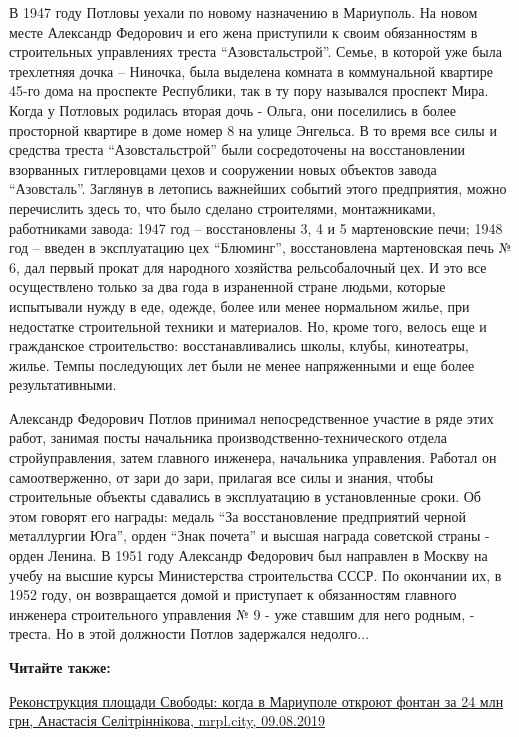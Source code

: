 В 1947 году Потловы уехали по новому назначению в Мариуполь. На новом месте
Александр Федорович и его жена приступили к своим обязанностям в строительных
управлениях треста \enquote{Азовстальстрой}. Семье, в которой уже была
трехлетняя дочка – Ниночка, была выделена комната в коммунальной квартире 45-го
дома на проспекте Республики, так в ту пору назывался проспект Мира. Когда у
Потловых родилась вторая дочь - Ольга, они поселились в более просторной
квартире в доме номер 8 на улице Энгельса. В то время все силы и средства
треста \enquote{Азовстальстрой} были сосредоточены на восстановлении взорванных
гитлеровцами цехов и сооружении новых объектов завода \enquote{Азовсталь}.
Заглянув в летопись важнейших событий этого предприятия, можно перечислить
здесь то, что было сделано строителями, монтажниками, работниками завода: 1947
год – восстановлены 3, 4 и 5 мартеновские печи; 1948 год – введен в
эксплуатацию цех \enquote{Блюминг}, восстановлена мартеновская печь № 6, дал
первый прокат для народного хозяйства рельсобалочный цех. И это все
осуществлено только за два года в израненной стране людьми, которые испытывали
нужду в еде, одежде, более или менее нормальном жилье, при недостатке
строительной техники и материалов. Но, кроме того, велось еще и гражданское
строительство: восстанавливались школы, клубы, кинотеатры, жилье. Темпы
последующих лет были не менее напряженными и еще более результативными.

Александр Федорович Потлов принимал непосредственное участие в ряде этих работ,
занимая посты начальника производственно-технического отдела стройуправления,
затем главного инженера, начальника управления. Работал он самоотверженно, от
зари до зари, прилагая все силы и знания, чтобы строительные объекты сдавались
в эксплуатацию в установленные сроки. Об этом говорят его награды: медаль \enquote{За
восстановление предприятий черной металлургии Юга}, орден \enquote{Знак почета} и
высшая награда советской страны - орден Ленина. В 1951 году Александр Федорович
был направлен в Москву на учебу на высшие курсы Министерства строительства
СССР. По окончании их, в 1952 году, он возвращается домой и приступает к
обязанностям главного инженера строительного управления № 9 - уже ставшим для
него родным, - треста. Но в этой должности Потлов задержался недолго...

\textbf{Читайте также:} 

\href{https://mrpl.city/news/view/rekonstruktsiya-ploshhadi-svobody-kogda-v-mariupole-otkroyut-fontan-za-24-mln-grn-foto}{%
Реконструкция площади Свободы: когда в Мариуполе откроют фонтан за 24 млн грн, Анастасія Селітріннікова, mrpl.city, 09.08.2019}

